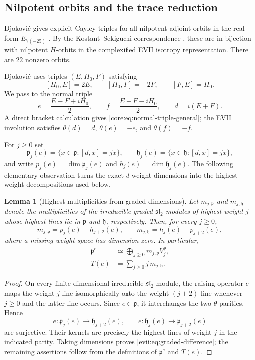 \documentclass[10pt,a4paper]{amsart}
\numberwithin{equation}{section}
\newtheorem{lemma}[theorem]{Lemma}
\newcommand{\fh}{\mathfrak h}
\newcommand{\fp}{\mathfrak p}
\begin{document}
\subsection{Nilpotent orbits and the trace reduction}

Djokovi\'c gives explicit Cayley triples for all nilpotent adjoint orbits in
the real form $E_{7(-25)}$ \cite[Table~6]{Djokovic}.  By the
Kostant--Sekiguchi correspondence \cite[Chapter~9]{CM}, these are in
bijection with nilpotent $H$-orbits in the complexified EVII isotropy
representation.  There are $22$ nonzero orbits.

Djokovi\'c uses triples $(E,H_0,F)$ satisfying
\[
 [H_0,E]=2E,
 \qquad
 [H_0,F]=-2F,
 \qquad
 [F,E]=H_0.
\]
We pass to the normal triple
\begin{equation}\label{evii:eq:EVII-Cayley-transform}
 e=\frac{E-F+iH_0}{2},
 \qquad
 f=\frac{E-F-iH_0}{2},
 \qquad
 d=i(E+F).
\end{equation}
A direct bracket calculation gives \eqref{core:eq:normal-triple-general}; the EVII
involution satisfies $\theta(d)=d$, $\theta(e)=-e$, and $\theta(f)=-f$.

For $j\geq0$ set
\[
 \fp_j(e)=\{x\in\fp:[d,x]=jx\},\qquad
 \fh_j(e)=\{x\in\fh:[d,x]=jx\},
\]
and write $p_j(e)=\dim\fp_j(e)$ and $h_j(e)=\dim\fh_j(e)$.
The following elementary observation turns the exact $d$-weight dimensions
into the highest-weight decompositions used below.

\begin{lemma}[Highest multiplicities from graded dimensions]
\label{evii:lem:graded-multiplicities}
Let $m_{j,\fp}$ and $m_{j,\fh}$ denote the multiplicities of the irreducible
graded $\mathfrak{sl}_2$-modules of highest weight $j$ whose highest lines lie
in $\fp$ and $\fh$, respectively.  Then, for every $j\geq0$,
\begin{equation}\label{evii:eq:graded-difference}
 m_{j,\fp}=p_j(e)-h_{j+2}(e),\qquad
 m_{j,\fh}=h_j(e)-p_{j+2}(e),
\end{equation}
where a missing weight space has dimension zero.  In particular,
\begin{align}
 \fp^e&\simeq\bigoplus_{j\geq0}m_{j,\fp}V_j^{\fp},
 \label{evii:eq:p-highest-from-weights}\\
 T(e)&=\sum_{j\geq0}j\,m_{j,\fh}.
 \label{evii:eq:T-from-weights}
\end{align}
\end{lemma}

\begin{proof}
On every finite-dimensional irreducible $\mathfrak{sl}_2$-module, the raising
operator $e$ maps the weight-$j$ line isomorphically onto the weight-$(j+2)$
line whenever $j\geq0$ and the latter line occurs.  Since $e\in\fp$, it
interchanges the two $\theta$-parities.  Hence
\[
 e:\fp_j(e)\longrightarrow\fh_{j+2}(e),\qquad
 e:\fh_j(e)\longrightarrow\fp_{j+2}(e)
\]
are surjective.  Their kernels are precisely the highest lines of weight $j$
in the indicated parity.  Taking dimensions proves
\eqref{evii:eq:graded-difference}; the remaining assertions follow from the
definitions of $\fp^e$ and $T(e)$.
\end{proof}
\end{document}
